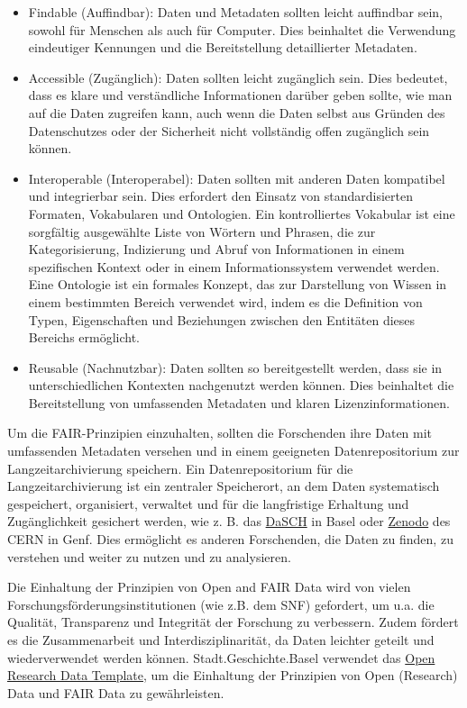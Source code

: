 \documentclass[
  letterpaper,
  DIV=11,
  numbers=noendperiod]{scrartcl}
\begin{document}
\begin{itemize}
\item
  Findable (Auffindbar): Daten und Metadaten sollten leicht auffindbar
  sein, sowohl für Menschen als auch für Computer. Dies beinhaltet die
  Verwendung eindeutiger Kennungen und die Bereitstellung detaillierter
  Metadaten.
\item
  Accessible (Zugänglich): Daten sollten leicht zugänglich sein. Dies
  bedeutet, dass es klare und verständliche Informationen darüber geben
  sollte, wie man auf die Daten zugreifen kann, auch wenn die Daten
  selbst aus Gründen des Datenschutzes oder der Sicherheit nicht
  vollständig offen zugänglich sein können.
\item
  Interoperable (Interoperabel): Daten sollten mit anderen Daten
  kompatibel und integrierbar sein. Dies erfordert den Einsatz von
  standardisierten Formaten, Vokabularen und Ontologien. Ein
  kontrolliertes Vokabular ist eine sorgfältig ausgewählte Liste von
  Wörtern und Phrasen, die zur Kategorisierung, Indizierung und Abruf
  von Informationen in einem spezifischen Kontext oder in einem
  Informationssystem verwendet werden. Eine Ontologie ist ein formales
  Konzept, das zur Darstellung von Wissen in einem bestimmten Bereich
  verwendet wird, indem es die Definition von Typen, Eigenschaften und
  Beziehungen zwischen den Entitäten dieses Bereichs ermöglicht.
\item
  Reusable (Nachnutzbar): Daten sollten so bereitgestellt werden, dass
  sie in unterschiedlichen Kontexten nachgenutzt werden können. Dies
  beinhaltet die Bereitstellung von umfassenden Metadaten und klaren
  Lizenzinformationen.
\end{itemize}

Um die FAIR-Prinzipien einzuhalten, sollten die Forschenden ihre Daten
mit umfassenden Metadaten versehen und in einem geeigneten
Datenrepositorium zur Langzeitarchivierung speichern. Ein
Datenrepositorium für die Langzeitarchivierung ist ein zentraler
Speicherort, an dem Daten systematisch gespeichert, organisiert,
verwaltet und für die langfristige Erhaltung und Zugänglichkeit
gesichert werden, wie z. B. das \href{https://www.dasch.swiss/}{DaSCH}
in Basel oder \href{https://zenodo.org/}{Zenodo} des CERN in Genf. Dies
ermöglicht es anderen Forschenden, die Daten zu finden, zu verstehen und
weiter zu nutzen und zu analysieren.

Die Einhaltung der Prinzipien von Open and FAIR Data wird von vielen
Forschungsförderungsinstitutionen (wie z.B. dem SNF) gefordert, um u.a.
die Qualität, Transparenz und Integrität der Forschung zu verbessern.
Zudem fördert es die Zusammenarbeit und Interdisziplinarität, da Daten
leichter geteilt und wiederverwendet werden können.
Stadt.Geschichte.Basel verwendet das
\href{https://github.com/maehr/open-research-data-template}{Open
Research Data Template}, um die Einhaltung der Prinzipien von Open
(Research) Data und FAIR Data zu gewährleisten.
\end{document}

